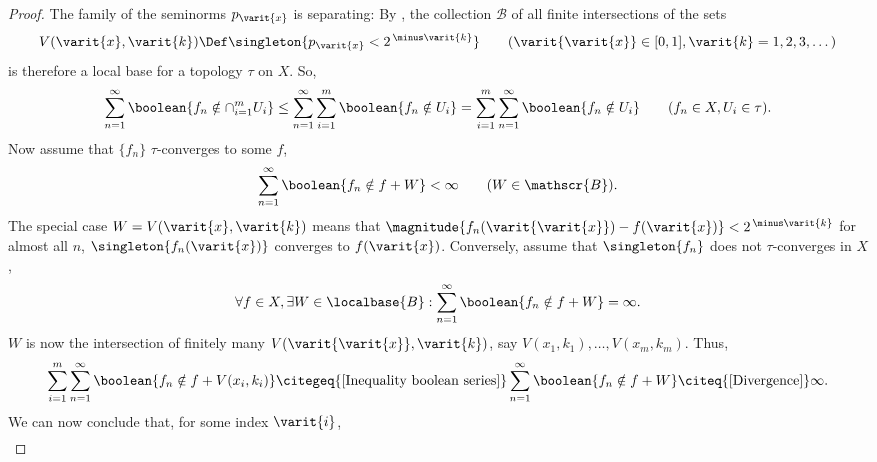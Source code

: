 \begin{proof}
%
The family of the seminorms $p_{\varit{x}}$ is separating: 
By , the collection $\mathscr{B}$ of all finite intersections 
of the sets 
%
  \begin{align}
    V(\varit{x},\varit{k})
      \Def 
    \singleton{p_\varit{x} < 2^{\,\minus \varit{k}}} 
      \quad\quad
    (\varit{\varit{x}} \in [0, 1], \varit{k}=1, 2, 3, \dots)
  \end{align}
%
is therefore a local base for a topology $\tau$ on $X$. 
So, 
%
  \begin{align}
    \label{Inequality boolean series}
    \sum_{n=1}^\infty \boolean{f_n \notin \cap_{i=1}^m U_i} \leq 
    \sum_{n=1}^\infty \sum_{i=1}^m \boolean{f_n \notin U_{i}} = 
    \sum_{i=1}^m \sum_{n=1}^\infty \boolean{f_n \notin U_i} %
    \quad\quad (f_n \in X, U_i \in \tau).
  \end{align}%
%
Now assume that $\{f_n\}$ $\tau$-converges to some $f$, \ie 
%
  \begin{align}
    \sum_{n=1}^\infty \boolean{f_n \notin f + W} < \infty \quad\quad (W \in \mathscr{B}).
  \end{align}
The special case %
%
$W = V(\varit{x}, \varit{k})$ %
%
means that %
%
  $\magnitude{f_n(\varit{\varit{x}}) - f(\varit{x})} < 2^{\,\minus \varit{k}}$ %
%
for almost all $n$,  \ie 
  $\singleton{f_n(\varit{x})}$ converges to $f(\varit{x})$. 
Conversely, assume that $\singleton{f_n}$ does not $\tau$-converges in $X$, \ie 
%
  \begin{align}
    \label{Divergence}
    \forall f \in X, \exists W \in \localbase{B}: 
      \sum_{n=1}^\infty\boolean{f_n \notin f +  W} = \infty. 
  \end{align}
%
$W$ is now the intersection of finitely many %
%
$V(\varit{\varit{x}}, \varit{k})$, %
%
say  
%
  $ V(x_1, k_1), \dots, V(x_m, k_m)$. Thus,  %
%
  \begin{align}
    \sum_{i=1}^m \sum_{n=1}^\infty \boolean{f_n \notin f + V(x_i, k_i)}
        \citegeq{\ref{Inequality boolean series}} 
    \sum_{n=1}^\infty \boolean{f_n \notin f + W}
      \citeq{\ref{Divergence}} 
    \infty .
  \end{align}
%
We can now conclude that, for some index $\varit{i}$, 
%
  \begin{align}

\end{align}
\end{proof}
